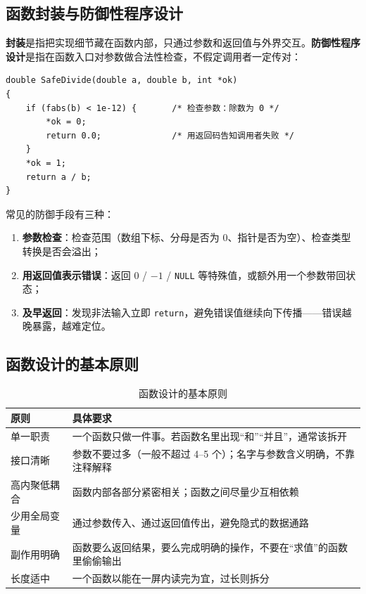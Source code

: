 \subsection{函数封装与防御性程序设计}

\textbf{封装}是指把实现细节藏在函数内部，只通过参数和返回值与外界交互。\textbf{防御性程序设计}是指在函数入口对参数做合法性检查，不假定调用者一定传对：

\begin{lstlisting}
double SafeDivide(double a, double b, int *ok)
{
    if (fabs(b) < 1e-12) {       /* 检查参数：除数为 0 */
        *ok = 0;
        return 0.0;              /* 用返回码告知调用者失败 */
    }
    *ok = 1;
    return a / b;
}
\end{lstlisting}

常见的防御手段有三种：

\begin{enumerate}
  \item \textbf{参数检查}：检查范围（数组下标、分母是否为 0、指针是否为空）、检查类型转换是否会溢出；
  \item \textbf{用返回值表示错误}：返回 0 / $-1$ / \texttt{NULL} 等特殊值，或额外用一个参数带回状态；
  \item \textbf{及早返回}：发现非法输入立即 \texttt{return}，避免错误值继续向下传播——错误越晚暴露，越难定位。
\end{enumerate}

\subsection{函数设计的基本原则}

\begin{table}[htbp]
\centering
\caption{函数设计的基本原则}
\small
\begin{tabularx}{\textwidth}{@{}lX@{}}
\toprule
原则 & 具体要求 \\
\midrule
单一职责 & 一个函数只做一件事。若函数名里出现“和”“并且”，通常该拆开 \\
接口清晰 & 参数不要过多（一般不超过 4--5 个）；名字与参数含义明确，不靠注释解释 \\
高内聚低耦合 & 函数内部各部分紧密相关；函数之间尽量少互相依赖 \\
少用全局变量 & 通过参数传入、通过返回值传出，避免隐式的数据通路 \\
副作用明确 & 函数要么返回结果，要么完成明确的操作，不要在“求值”的函数里偷偷输出 \\
长度适中 & 一个函数以能在一屏内读完为宜，过长则拆分 \\
\bottomrule
\end{tabularx}
\end{table}

